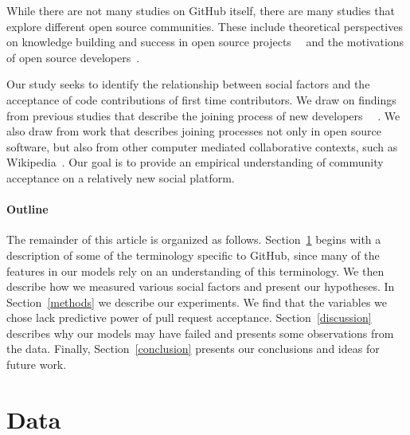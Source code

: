 \documentclass[12pt]{article}
\begin{document}
While there are not many studies on GitHub itself, there are many studies that
explore different open source communities. These include theoretical
perspectives on knowledge building and success in open source
projects~\cite{hemetsberger_learning_2006}~\cite{hemetsberger_collective_2009}
and the motivations of open source
developers~\cite{hertel_motivation_2003}\cite{lakhani_why_2003}.

Our study seeks to identify the relationship between social factors and the
acceptance of code contributions of first time contributors. We draw on findings
from previous studies that describe the joining process of new developers
~~\cite{huang_mining_2005}\cite{von_krogh_community_2003}. We also draw from
work that describes joining processes not only in open source software, but also
from other computer mediated collaborative contexts, such as
Wikipedia~\cite{bryant_becoming_2005}. Our goal is to provide an empirical
understanding of community acceptance on a relatively new social platform.


\paragraph{Outline}
The remainder of this article is organized as follows.
Section~\ref{data} begins with a description of some of the terminology specific
to GitHub, since many of the features in our models rely on an understanding of
this terminology. We then describe how we measured various social factors and
present our hypotheses. In Section~\ref{methods} we describe our experiments. We
find that the variables we chose lack predictive power of pull request
acceptance. Section~\ref{discussion} describes why our models may have failed
and presents some observations from the data. Finally, Section~\ref{conclusion}
presents our conclusions and ideas for future work.

\section{Data}\label{data}
\end{document}
